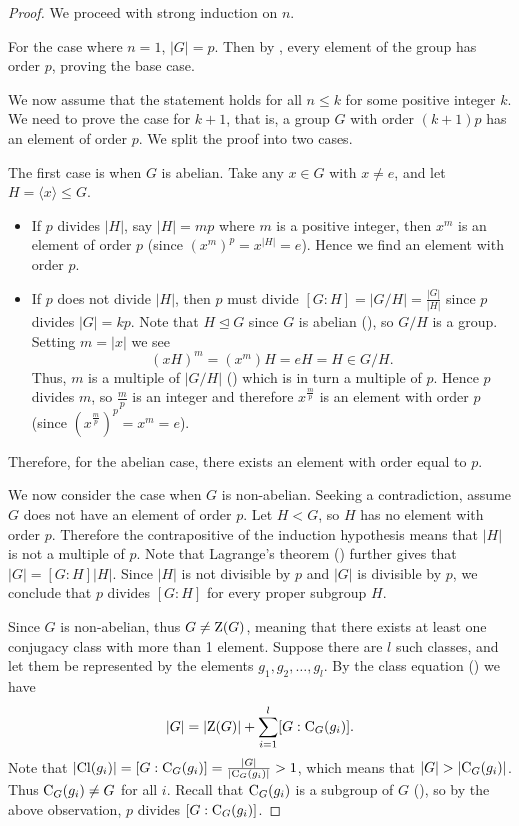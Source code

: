 \begin{proof}
    We proceed with strong induction on $n$.

    For the case where $n = 1$, $|G| = p$. Then by , every element of the group has order $p$, proving the base case.

    We now assume that the statement holds for all $n \leq k$ for some positive integer $k$. We need to prove the case for $k+1$, that is, a group $G$ with order $(k+1)p$ has an element of order $p$. We split the proof into two cases.

    The first case is when $G$ is abelian. Take any $x \in G$ with $x \neq e$, and let $H = \langle x \rangle \leq G$.
    \begin{itemize}
        \item If $p$ divides $|H|$, say $|H| = mp$ where $m$ is a positive integer, then $x^m$ is an element of order $p$ (since $\left(x^m\right)^p = x^{|H|} = e$). Hence we find an element with order $p$.
        \item If $p$ does not divide $|H|$, then $p$ must divide $[G:H] = |G/H| = \frac{|G|}{|H|}$ since $p$ divides $|G| = kp$. Note that $H \unlhd G$ since $G$ is abelian (), so $G/H$ is a group. Setting $m = |x|$ we see
        \[
            (xH)^m = (x^m)H = eH = H \in G/H.
        \]
        Thus, $m$ is a multiple of $|G/H|$ () which is in turn a multiple of $p$. Hence $p$ divides $m$, so $\frac mp$ is an integer and therefore $x^{\frac mp}$ is an element with order $p$ (since $\left(x^{\frac mp}\right)^p = x^m = e$).
    \end{itemize}
    Therefore, for the abelian case, there exists an element with order equal to $p$.

    We now consider the case when $G$ is non-abelian. Seeking a contradiction, assume $G$ does not have an element of order $p$. Let $H < G$, so $H$ has no element with order $p$. Therefore the contrapositive of the induction hypothesis means that $|H|$ is not a multiple of $p$. Note that Lagrange's theorem () further gives that $|G| = [G:H]|H|$. Since $|H|$ is not divisible by $p$ and $|G|$ is divisible by $p$, we conclude that $p$ divides $[G:H]$ for every proper subgroup $H$.

    Since $G$ is non-abelian, thus $G \neq \mathrm{Z}(G)$, meaning that there exists at least one conjugacy class with more than 1 element. Suppose there are $l$ such classes, and let them be represented by the elements $g_1, g_2, \dots, g_l$. By the class equation () we have
    \[
        |G| = |\mathrm{Z}(G)| + \sum_{i=1}^l [G:\mathrm{C}_{G}(g_i)].
    \]
    Note that $|\mathrm{Cl}(g_i)| = [G:\mathrm{C}_{G}(g_i)] = \frac{|G|}{|\mathrm{C}_{G}(g_i)|} > 1$, which means that $|G| > |\mathrm{C}_{G}(g_i)|$. Thus $\mathrm{C}_{G}(g_i) \neq G$ for all $i$. Recall that $\mathrm{C}_{G}(g_i)$ is a subgroup of $G$ (), so by the above observation, $p$ divides $[G:\mathrm{C}_{G}(g_i)]$.


\end{proof}
